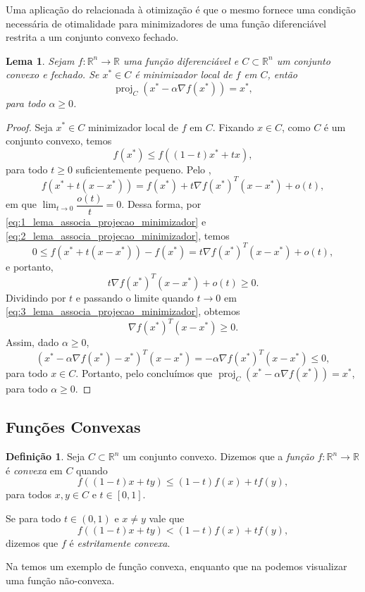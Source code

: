 \documentclass[12pt,a4paper]{scrartcl}
\DeclareMathOperator{\proj}{proj}
\def\RR{\mathds{R}}
\newtheorem{lema}{Lema}
\theoremstyle{definition}%
\newtheorem{defi}{Definição}
\begin{document}
Uma aplicação do  relacionada à otimização é que o mesmo fornece uma condição necessária de otimalidade para minimizadores de uma função diferenciável restrita a um conjunto convexo fechado.


\begin{lema} \label{lema:associa_projecao_minimizador}
Sejam $f: \RR^{n} \rightarrow \RR$ uma função diferenciável e $C \subset \RR^{n}$ um conjunto convexo e fechado. Se $x^{*} \in C$ é minimizador local de $f$ em $C$, então
\[
\proj_{C} (x^{*} - \alpha \nabla f(x^{*})) = x^{*} ,
\]
para todo $\alpha \geq 0$.
\end{lema}
\begin{proof}
Seja $x^{*} \in C$ minimizador local de $f$ em $C$. Fixando $x\in C$, como $C$ é um conjunto convexo, temos
\[ \label{eq:1_lema_associa_projecao_minimizador}
f(x^{*}) \leq f((1-t)x^{*} + tx),
\]
para todo $t\geq 0$ suficientemente pequeno. Pelo , 
\[ \label{eq:2_lema_associa_projecao_minimizador}
f(x^{*}+t(x-x^{*})) = f(x^{*}) + t\nabla f(x^{*})^{T}(x-x^{*}) + o(t) ,
\]
em que $\displaystyle\lim_{t\rightarrow 0} \dfrac{o(t)}{t} = 0$. Dessa forma, por \eqref{eq:1_lema_associa_projecao_minimizador} e \eqref{eq:2_lema_associa_projecao_minimizador}, temos
\[
0 \leq f(x^{*}+t(x-x^{*})) - f(x^{*}) = t\nabla f(x^{*})^{T}(x-x^{*}) + o(t) ,
\]
e portanto, 
\[ \label{eq:3_lema_associa_projecao_minimizador}
t\nabla f(x^{*})^{T}(x-x^{*}) + o(t) \geq 0.
\]
Dividindo por $t$ e passando o limite quando $t \rightarrow 0$ em \eqref{eq:3_lema_associa_projecao_minimizador}, obtemos
\[
\nabla f(x^{*})^{T}(x-x^{*}) \geq 0.
\]
Assim, dado $\alpha \geq 0$,
\[
(x^{*} - \alpha \nabla f(x^{*}) - x^{*})^{T}(x-x^{*}) = -\alpha \nabla f(x^{*})^{T}(x-x^{*}) \leq 0,
\]
para todo $x\in C$. Portanto, pelo  concluímos que $\proj_{C} (x^{*} - \alpha \nabla f(x^{*})) = x^{*}$, para todo $\alpha \geq 0$.
\end{proof}




\subsection{Funções Convexas}

\begin{defi} \label{defi:funcao_convexa}
Seja $C \subset \RR^{n}$ um conjunto convexo. Dizemos que a \emph{função} $f: \RR^{n} \rightarrow \RR$ é \emph{convexa} em $C$ quando
\[
f((1-t)x + ty) \leq (1-t)f(x) + tf(y),
\]
para todos $x,y \in C$ e $t \in [0,1]$.

Se para todo $t \in (0,1)$ e $x \neq y$ vale que
\[
f((1-t)x + ty) < (1-t)f(x) + tf(y),
\]
dizemos que $f$ é \emph{estritamente convexa}.
\end{defi}
Na  temos um exemplo de função convexa, enquanto que na  podemos visualizar uma função não-convexa.
\end{document}

